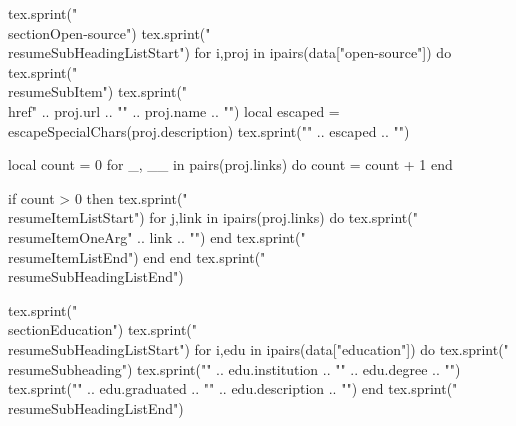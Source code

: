 \documentclass[letterpaper,11pt]{article}
\makeatletter
\newcommand{\resumeItem}[2]{%
  \item\small{%
    \textbf{#1:} #2%
  }%
}
\newcommand{\resumeItemOneArg}[1]{%
  \item\small{%
    \textbf{#1}%
  }%
}
\newcommand{\resumeSubheading}[4]{
  \vspace{-1pt}\item
    \begin{tabular*}{0.97\textwidth}[t]{l@{\extracolsep{\fill}}r}
      \textbf{#1} & #2 \\
      \textit{\small#3} & \textit{\small #4} \\
    \end{tabular*}\vspace{-5pt}
}
\newcommand{\resumeSubItem}[2]{\resumeItem{#1}{#2}\vspace{-4pt}}
\newcommand{\resumeSubHeadingListStart}{\begin{itemize}[leftmargin=*]}
\newcommand{\resumeSubHeadingListEnd}{\end{itemize}}
\newcommand{\resumeItemListStart}{\begin{itemize}}
\newcommand{\resumeItemListEnd}{\end{itemize}\vspace{-5pt}}
\makeatother
\begin{document}

\begin{luacode}
  tex.sprint("\\section{Open-source}")
  tex.sprint("\\resumeSubHeadingListStart")
  for i,proj in ipairs(data["open-source"]) do
    tex.sprint("\\resumeSubItem")
    tex.sprint("{\\href{" .. proj.url .. "}{" .. proj.name .. "}}")
    local escaped = escapeSpecialChars(proj.description)
    tex.sprint("{" .. escaped .. "}")

    local count = 0
    for _, __ in pairs(proj.links) do 
      count = count + 1
    end

    if count > 0 then
      tex.sprint("\\resumeItemListStart")
      for j,link in ipairs(proj.links) do
        tex.sprint("\\resumeItemOneArg{" .. link .. "}")
      end
      tex.sprint("\\resumeItemListEnd")
    end
  end
  tex.sprint("\\resumeSubHeadingListEnd")
\end{luacode}

\begin{luacode}
  tex.sprint("\\section{Education}")
  tex.sprint("\\resumeSubHeadingListStart")
  for i,edu in ipairs(data["education"]) do
    tex.sprint("\\resumeSubheading")
    tex.sprint("{" .. edu.institution .. "}{" .. edu.degree .. "}")
    tex.sprint("{" .. edu.graduated .. "}{" .. edu.description .. "}")
  end
  tex.sprint("\\resumeSubHeadingListEnd")
\end{luacode}

\end{document}
